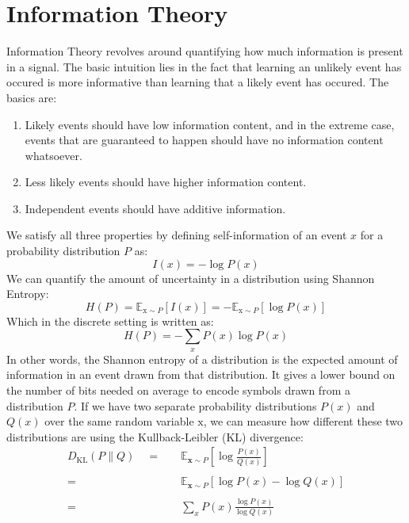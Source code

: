 \documentclass[twoside,twocolumn]{article}
\begin{document}
\section{Information Theory}
Information Theory revolves around quantifying how much information is present
in a signal. The basic intuition lies in the fact that learning an unlikely
event has occured is more informative than learning that a likely event has
occured. The basics are:
\begin{enumerate}
  \item Likely events should have low information content, and in the extreme
  case, events that are guaranteed to happen should have no information content
  whatsoever.
  \item Less likely events should have higher information content.
  \item Independent events should have additive information.
\end{enumerate}
We satisfy all three properties by defining self-information of an event $x$
for a probability distribution $P$ as:
\begin{equation}
  I(x) = -\log P(x)
\end{equation}
We can quantify the amount of uncertainty in a distribution using Shannon
Entropy:
\begin{equation}
  H ( P ) = \mathbb { E } _ { \mathrm { x } \sim P } [ I ( x ) ] = - \mathbb { E } _ { \mathrm { x } \sim P } [ \log P ( x ) ]
\end{equation}
Which in the discrete setting is written as:
\begin{equation}
  H ( P ) = -\sum_{x} P(x) \log P(x)
\end{equation}
In other words, the Shannon entropy of a distribution is the expected amount
of information in an event drawn from that distribution. It gives a lower bound
on the number of bits needed on average to encode symbols drawn
from a distribution $P$. If we have two separate probability distributions
$P(x)$ and $Q(x)$ over the same random variable $\mathrm{x}$, we can measure how
different these two distributions are using the Kullback-Leibler (KL)
divergence:
\begin{equation}
  \begin{split}
    D _ { \mathrm { KL } } ( P \| Q ) \quad =& \quad \mathbb { E } _ { \mathbf { x } \sim P } \left[ \log \frac { P ( x ) } { Q ( x ) } \right]\\
    \\
    =& \quad \mathbb { E } _ { \mathbf { x } \sim P } \left[ \log P ( x ) - \log Q ( x ) \right] \\
    \\
    =& \quad \sum_x P(x) \frac{\log P(x)}{\log Q(x)} \\
  \end{split}
\end{equation}
\end{document}
